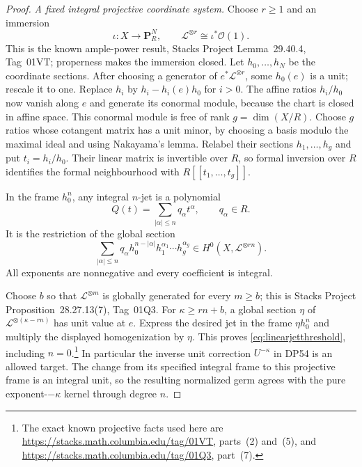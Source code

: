 \begin{proof}
\emph{A fixed integral projective coordinate system.}
Choose $r\ge1$ and an immersion
\[
 \iota:X\longrightarrow\mathbf P^N_R,
 \qquad \mathcal L^{\otimes r}\cong\iota^*\mathcal O(1).
\]
This is the known ample-power result, Stacks Project Lemma~29.40.4, Tag~01VT; properness makes the immersion closed.
Let $h_0,\ldots,h_N$ be the coordinate sections.
After choosing a generator of $e^*\mathcal L^{\otimes r}$, some $h_0(e)$ is a unit; rescale it to one.
Replace $h_i$ by $h_i-h_i(e)h_0$ for $i>0$.
The affine ratios $h_i/h_0$ now vanish along $e$ and generate its conormal module, because the chart is closed in affine space.
This conormal module is free of rank $g=\dim(X/R)$.
Choose $g$ ratios whose cotangent matrix has a unit minor, by choosing a basis modulo the maximal ideal and using Nakayama's lemma.
Relabel their sections $h_1,\ldots,h_g$ and put $t_i=h_i/h_0$.
Their linear matrix is invertible over $R$, so formal inversion over $R$ identifies the formal neighbourhood with $R[[t_1,\ldots,t_g]]$.

In the frame $h_0^n$, any integral $n$-jet is a polynomial
\[
 Q(t)=\sum_{|\alpha|\le n}q_\alpha t^\alpha,
 \qquad q_\alpha\in R.
\]
It is the restriction of the global section
\[
 \sum_{|\alpha|\le n}q_\alpha
 h_0^{n-|\alpha|}h_1^{\alpha_1}\cdots h_g^{\alpha_g}
 \in H^0(X,\mathcal L^{\otimes rn}).
\]
All exponents are nonnegative and every coefficient is integral.

Choose $b$ so that $\mathcal L^{\otimes m}$ is globally generated for every $m\ge b$; this is Stacks Project Proposition~28.27.13(7), Tag~01Q3.
For $\kappa\ge rn+b$, a global section $\eta$ of $\mathcal L^{\otimes(\kappa-rn)}$ has unit value at $e$.
Express the desired jet in the frame $\eta h_0^n$ and multiply the displayed homogenization by $\eta$.
This proves \eqref{eq:linearjetthreshold}, including $n=0$.\footnote{The exact known projective facts used here are \url{https://stacks.math.columbia.edu/tag/01VT}, parts~(2) and~(5), and \url{https://stacks.math.columbia.edu/tag/01Q3}, part~(7).}
In particular the inverse unit correction $U^{-\kappa}$ in DP54 is an allowed target. The change from its specified integral frame to this projective frame is an integral unit, so the resulting normalized germ agrees with the pure exponent-$-\kappa$ kernel through degree $n$.


\end{proof}
